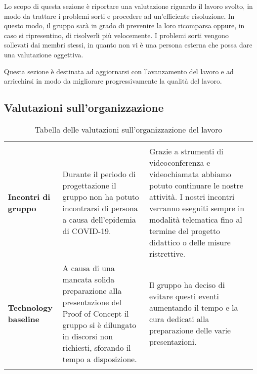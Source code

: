 \documentclass[../piano-di-qualifica.tex]{subfiles}
\begin{document}
Lo scopo di questa sezione è riportare una valutazione riguardo il lavoro svolto, in modo da trattare
i problemi sorti e procedere ad un'efficiente risoluzione.
In questo modo, il gruppo sarà in grado di prevenire la loro ricomparsa oppure, in caso si ripresentino, di risolverli più velocemente.
I problemi sorti vengono sollevati dai membri stessi, in quanto non vi è una
persona esterna che possa dare una valutazione oggettiva.

Questa sezione è destinata ad aggiornarsi con l'avanzamento del lavoro e ad arricchirsi in modo
da migliorare progressivamente la qualità del lavoro.

\subsection{Valutazioni sull'organizzazione}

\begin{longtable}[H]{>{\centering\bfseries}m{4cm} >{\centering\arraybackslash}m{6cm} >{\centering\arraybackslash}m{6cm}}
  \rowcolor{darkgray!90!}
  \color{white}{\textbf{Dominio}} & \color{white}{\textbf{Problema}}                                                                                                                                         & \color{white}{\textbf{Soluzione}}                                                                                                                                                                                                        \\
  Incontri di gruppo              & Durante il periodo di progettazione il gruppo non ha potuto incontrarsi di persona a causa dell'epidemia di COVID-19.                                                    & Grazie a strumenti di videoconferenza e videochiamata abbiamo potuto continuare le nostre attività. I nostri incontri verranno eseguiti sempre in modalità telematica fino al termine del progetto didattico o delle misure ristrettive. \\
  Technology baseline             & A causa di una mancata solida preparazione alla presentazione del Proof of Concept il gruppo si è dilungato in discorsi non richiesti, sforando il tempo a disposizione. & Il gruppo ha deciso di evitare questi eventi aumentando il tempo e la cura dedicati alla preparazione delle varie presentazioni.                                                                                                         \\
  \rowcolor{white}
  \caption{Tabella delle valutazioni sull'organizzazione del lavoro}%
  \label{tab:valutazioni_organizzazione}
\end{longtable}
\end{document}
